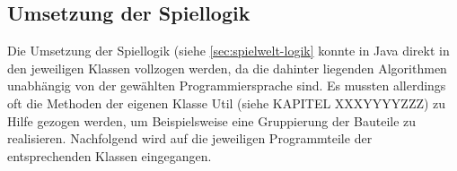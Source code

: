 \subsection{Umsetzung der Spiellogik}
\label{sub:fachkonzept-implementierung-spiellogik}

Die Umsetzung der Spiellogik (siehe \ref{sec:spielwelt-logik} konnte in Java direkt in den jeweiligen Klassen vollzogen werden, da die dahinter liegenden Algorithmen unabhängig von der gewählten Programmiersprache sind. Es mussten allerdings oft die Methoden der eigenen Klasse Util (siehe KAPITEL XXXYYYYZZZ) zu Hilfe gezogen werden, um Beispielsweise eine Gruppierung der Bauteile zu realisieren. Nachfolgend wird auf die jeweiligen Programmteile der entsprechenden Klassen eingegangen.







